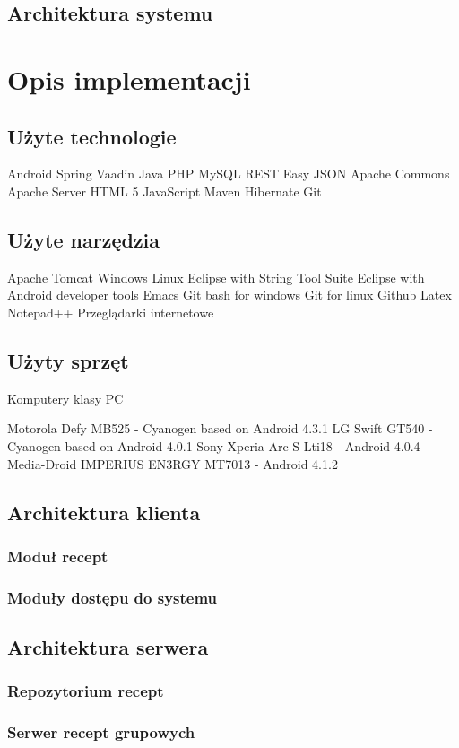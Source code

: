 \documentclass[11pt,a4paper,polish,thesis]{dcsbook}
\begin{document}
\section{Architektura systemu}


\chapter{Opis implementacji}
\section{Użyte technologie}
Android
Spring
Vaadin
Java
PHP
MySQL
REST Easy
JSON
Apache Commons
Apache Server
HTML 5
JavaScript
Maven
Hibernate
Git
\section{Użyte narzędzia}
Apache Tomcat
Windows
Linux
Eclipse with String Tool Suite
Eclipse with Android developer tools
Emacs
Git bash for windows
Git for linux
Github
Latex
Notepad++
Przeglądarki internetowe
\section{Użyty sprzęt}
Komputery klasy PC

Motorola Defy MB525 - Cyanogen based on Android 4.3.1
LG Swift GT540 - Cyanogen based on Android 4.0.1
Sony Xperia Arc S Lti18 - Android 4.0.4
Media-Droid IMPERIUS EN3RGY MT7013 - Android 4.1.2

\section{Architektura klienta}
\subsection{Moduł recept}
\subsection{Moduły dostępu do systemu}
\section{Architektura serwera}
\subsection{Repozytorium recept}
\subsection{Serwer recept grupowych}
\end{document}
